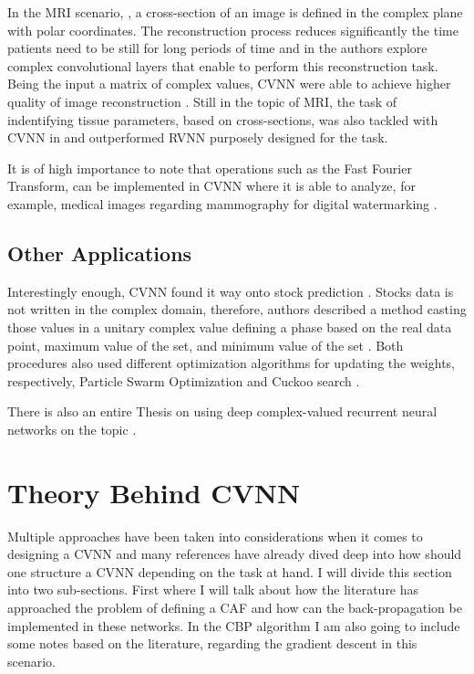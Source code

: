 In the MRI scenario, \parencite{cole2020analysis, cole2021analysis}, a cross-section of an image is defined in the complex plane with polar coordinates. The reconstruction process reduces significantly the time patients need to be still for long periods of time and in the authors explore complex convolutional layers that enable to perform this reconstruction task. Being the input a matrix of complex values, \gls{CVNN} were able to achieve higher quality of image reconstruction \parencite{cole2020analysis, cole2021analysis}. Still in the topic of MRI, the task of indentifying tissue parameters, based on cross-sections, was also tackled with \gls{CVNN} in \parencite{virtue2017mribettercvnn} and outperformed \gls{RVNN} purposely designed for the task.

It is of high importance to note that operations such as the Fast Fourier Transform, can be implemented in \gls{CVNN} where it is able to analyze, for example, medical images regarding mammography for digital watermarking \textcite{olanrewaju2011watermarkmed}.

\subsection{Other Applications}
Interestingly enough, \gls{CVNN} found it way onto stock prediction \parencite{jia2018stockpredcvnn, wang2017cvnnstockprediction}. Stocks data is not written in the complex domain, therefore, authors described a method casting those values in a unitary complex value defining a phase based on the real data point, maximum value of the set, and minimum value of the set \parencite{wang2021emmiteridcvnn}. Both procedures also used different optimization algorithms for updating the weights, respectively,  Particle Swarm Optimization \parencite{eberhart1995particle} and Cuckoo search \parencite{yang2014cuckoo}.

There is also an entire Thesis on using deep complex-valued recurrent neural networks on the topic \parencite{monning2019deep}.


\section{Theory Behind \gls{CVNN}}
Multiple approaches have been taken into considerations when it comes to designing a \gls{CVNN} and many references have already dived deep into how should one structure a \gls{CVNN} depending on the task at hand. I will divide this section into two sub-sections. First where I will talk about how the literature has approached the problem of defining a \gls{CAF} and how can the back-propagation be implemented in these networks. In the \gls{CBP} algorithm I am also going to include some notes based on the literature, regarding the gradient descent in this scenario.

